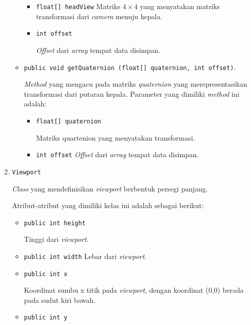 \begin{enumerate}
\begin{itemize}
			\begin{itemize}
				\item \texttt{float[] headView}
				Matriks $4\times4$ yang menyatakan matriks transformasi dari \textit{camera} menuju kepala. 
				
				\item \texttt{int offset}	
				
				\textit{Offset} dari \textit{array} tempat data disimpan.		
			\end{itemize}	
			
			\item \texttt{public void getQuaternion (float[] quaternion, int offset)}. 
			
			\textit{Method} yang mengacu pada matriks \textit{quaternion} yang merepresentasikan transformasi dari putaran kepala. Parameter yang dimiliki \textit{method} ini adalah:
			
			\begin{itemize}
				\item \texttt{float[] quaternion}
				
				Matriks quartenion yang menyatakan transformasi.
				
				\item \texttt{int offset}				
				\textit{Offset} dari \textit{array} tempat data disimpan.
			\end{itemize}
		\end{itemize}
		
		\item \texttt{Viewport}
		
		\textit{Class} yang mendefinisikan \textit{viewport} berbentuk persegi panjang. 
		
		Atribut-atribut yang dimiliki kelas ini adalah sebagai berikut:
		
		\begin{itemize}
			\item \texttt{public int height}
			
			Tinggi dari \textit{viewport}.
			
			\item \texttt{public int width}
			Lebar dari \textit{viewport}.			
			
			\item \texttt{public int x}
			
			Koordinat sumbu x titik pada \textit{viewport}, dengan koordinat (0,0) berada pada sudut kiri bawah.
			
			\item \texttt{public int y}
			

\end{itemize}
\end{enumerate}
